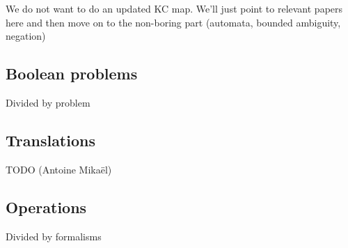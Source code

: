 We do not want to do an updated KC map. We'll just point to relevant papers here
and then move on to the non-boring part (automata, bounded ambiguity, negation)

\subsection{Boolean problems}

Divided by problem

\subsection{Translations}

TODO (Antoine Mikaël)

\subsection{Operations}

Divided by formalisms